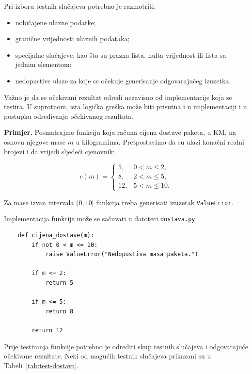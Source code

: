 Pri izboru testnih slučajeva potrebno je razmotriti:

\begin{itemize}
	\item uobičajene ulazne podatke;
	\item granične vrijednosti ulaznih podataka;
	\item specijalne slučajeve, kao što su prazna lista, 
	nulta vrijednost ili lista sa jednim elementom;
	\item nedopustive ulaze za koje se očekuje generisanje 
	odgovarajućeg izuzetka.
\end{itemize}

Važno je da se očekivani rezultat odredi nezavisno od 
implementacije koja se testira. U suprotnom, ista logička 
greška može biti prisutna i u implementaciji i u postupku 
određivanja očekivanog rezultata.

\textbf{Primjer.} Posmatrajmo funkciju koja računa cijenu 
dostave paketa, u KM, na osnovu njegove mase $m$ u 
kilogramima. Pretpostavimo da su ulazi konačni realni 
brojevi i da vrijedi sljedeći cjenovnik:

\[
c(m)=
\begin{cases}
	5, & 0<m\leq 2,\\
	8, & 2<m\leq 5,\\
	12, & 5<m\leq 10.
\end{cases}
\]

Za mase izvan intervala $(0,10]$ funkcija treba generisati 
izuzetak \texttt{ValueError}.

Implementacija funkcije može se sačuvati u datoteci 
\texttt{dostava.py}.

\begin{verbatim}
	def cijena_dostave(m):
	    if not 0 < m <= 10:
	        raise ValueError("Nedopustiva masa paketa.")
	
	    if m <= 2:
	        return 5
	
	    if m <= 5:
	        return 8
	
	    return 12
\end{verbatim}

Prije testiranja funkcije potrebno je odrediti skup 
testnih slučajeva i odgovarajuće očekivane rezultate. 
Neki od mogućih testnih slučajeva prikazani su u 
Tabeli~\ref{tab:test-dostava}.

